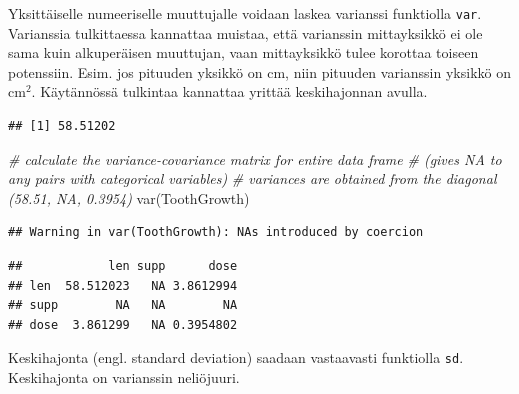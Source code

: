 \documentclass[
]{book}
\newenvironment{Shaded}{\begin{snugshade}}{\end{snugshade}}
\newcommand{\CommentTok}[1]{\textcolor[rgb]{0.56,0.35,0.01}{\textit{#1}}}
\newcommand{\FunctionTok}[1]{\textcolor[rgb]{0.00,0.00,0.00}{#1}}
\newcommand{\NormalTok}[1]{#1}
\newcommand{\SpecialCharTok}[1]{\textcolor[rgb]{0.00,0.00,0.00}{#1}}
\begin{document}
Yksittäiselle numeeriselle muuttujalle voidaan laskea varianssi funktiolla \texttt{var}. Varianssia tulkittaessa kannattaa muistaa, että varianssin mittayksikkö ei ole sama kuin alkuperäisen muuttujan, vaan mittayksikkö tulee korottaa toiseen potenssiin. Esim. jos pituuden yksikkö on cm, niin pituuden varianssin yksikkö on \(\text{cm}^2\). Käytännössä tulkintaa kannattaa yrittää keskihajonnan avulla.

\begin{Shaded}
\end{Shaded}

\begin{verbatim}
## [1] 58.51202
\end{verbatim}

\begin{Shaded}
\begin{Highlighting}[]
\CommentTok{\# calculate the variance{-}covariance matrix for entire data frame }
\CommentTok{\# (gives NA to any pairs with categorical variables)}
\CommentTok{\# variances are obtained from the diagonal (58.51, NA, 0.3954)}
\FunctionTok{var}\NormalTok{(ToothGrowth)}
\end{Highlighting}
\end{Shaded}

\begin{verbatim}
## Warning in var(ToothGrowth): NAs introduced by coercion
\end{verbatim}

\begin{verbatim}
##            len supp      dose
## len  58.512023   NA 3.8612994
## supp        NA   NA        NA
## dose  3.861299   NA 0.3954802
\end{verbatim}

Keskihajonta (engl. standard deviation) saadaan vastaavasti funktiolla \texttt{sd}. Keskihajonta on varianssin neliöjuuri.

\begin{Shaded}
\end{Shaded}
\end{document}
